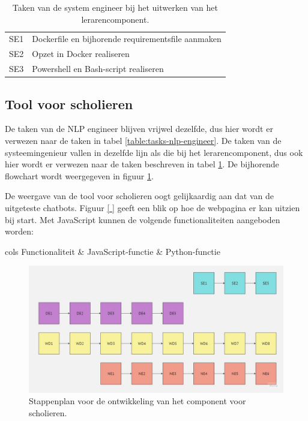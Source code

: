 \begin{center}
	\begin{table}
		\begin{tabular}{|m{2cm}|m{12cm}|}
			\hline
			SE1 & Dockerfile en bijhorende requirementsfile aanmaken \\
			SE2 & Opzet in Docker realiseren \\
			SE3 & Powershell en Bash-script realiseren \\
			\hline
		\end{tabular}
		\label{table:tasks-system-engineer}
		\caption{Taken van de system engineer bij het uitwerken van het lerarencomponent.}
	\end{table}
\end{center}


\subsection{Tool voor scholieren}

De taken van de NLP engineer blijven vrijwel dezelfde, dus hier wordt er verwezen naar de taken in tabel \ref{table:tasks-nlp-engineer}. De taken van de systeemingenieur vallen in dezelfde lijn als die bij het lerarencomponent, dus ook hier wordt er verwezen naar de taken beschreven in tabel \ref{table:tasks-system-engineer}. De bijhorende flowchart wordt weergegeven in figuur \ref{img:stappenplan-scholars}.

\medspace

De weergave van de tool voor scholieren oogt gelijkaardig aan dat van de uitgeteste chatbots. Figuur \ref{ } geeft een blik op hoe de webpagina er kan uitzien bij start. Met JavaScript kunnen de volgende functionaliteiten aangeboden worden:

\begin{center}
	\begin{table}
		\begin{tabular}{cols}
			\hline
			Functionaliteit & JavaScript-functie & Python-functie \\
			\hline
			
			\hline
		\end{tabular}
	\end{table}
\end{center}

\begin{figure}[H]
	\includegraphics[width=\linewidth]{img/flowchart-development-scholars.jpg}
	\caption{Stappenplan voor de ontwikkeling van het component voor scholieren.}
	\label{img:stappenplan-scholars}
\end{figure}

